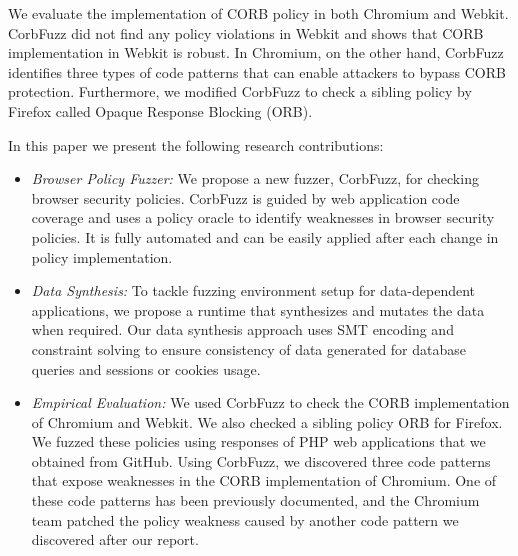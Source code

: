 \documentclass[10pt,conference]{IEEEtran}
\begin{document}
We evaluate the implementation of CORB policy in both Chromium and Webkit. CorbFuzz did not find any policy violations in Webkit and shows that CORB implementation in Webkit is robust. In Chromium, on the other hand, CorbFuzz identifies three types of code patterns that can enable attackers to bypass CORB protection. Furthermore, we modified CorbFuzz to check a sibling policy by Firefox called Opaque Response Blocking (ORB). %

In this paper we present the following research contributions:
\begin{itemize}
\item {\em Browser Policy Fuzzer:} We propose a new fuzzer, CorbFuzz, for checking browser security policies. CorbFuzz is guided by web application code coverage and uses a policy oracle to identify weaknesses in browser security policies. It is fully automated and can be easily applied after each change in policy implementation. 
\item {\em Data Synthesis:} To tackle fuzzing environment setup for data-dependent applications, we propose a runtime that synthesizes and mutates the data when required. Our data synthesis approach uses SMT encoding and constraint solving to ensure consistency of data generated for database queries and sessions or cookies usage.
\item {\em Empirical Evaluation:} We used CorbFuzz to check the CORB implementation of Chromium and Webkit. We also checked a sibling policy ORB for Firefox.
We fuzzed these policies using responses of PHP web applications that we obtained from GitHub. 
Using CorbFuzz, we discovered three code patterns that expose weaknesses in the CORB implementation of Chromium. One of these code patterns has been previously documented, and the Chromium team patched the policy weakness caused by another code pattern we discovered after our report. %
\end{itemize}
\end{document}
